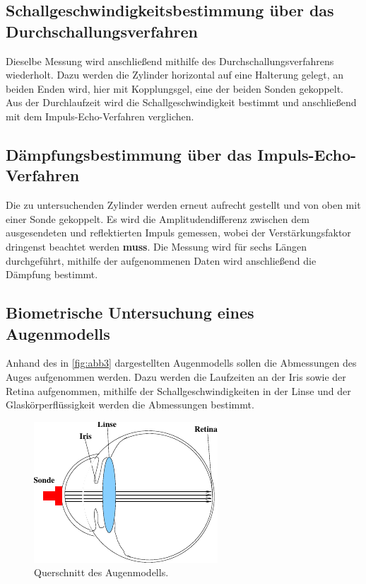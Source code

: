 \subsection*{Schallgeschwindigkeitsbestimmung über das Durchschallungsverfahren}

Dieselbe Messung wird anschließend mithilfe des Durchschallungsverfahrens wiederholt.
Dazu werden die Zylinder horizontal auf eine Halterung gelegt, an beiden Enden wird, hier mit Kopplungsgel, eine der beiden Sonden gekoppelt.
Aus der Durchlaufzeit wird die Schallgeschwindigkeit bestimmt und anschließend mit dem Impuls-Echo-Verfahren verglichen. \\


\subsection*{Dämpfungsbestimmung über das Impuls-Echo-Verfahren}

Die zu untersuchenden Zylinder werden erneut aufrecht gestellt und von oben mit einer Sonde gekoppelt.
Es wird die Amplitudendifferenz zwischen dem ausgesendeten und reflektierten Impuls gemessen, wobei der Verstärkungsfaktor dringenst beachtet werden \textbf{muss}.
Die Messung wird für sechs Längen durchgeführt, mithilfe der aufgenommenen Daten wird anschließend die Dämpfung bestimmt.


\subsection*{Biometrische Untersuchung eines Augenmodells}

Anhand des in \autoref{fig:abb3} dargestellten Augenmodells sollen die Abmessungen des Auges aufgenommen werden.
Dazu werden die Laufzeiten an der Iris sowie der Retina aufgenommen, mithilfe der Schallgeschwindigkeiten in der Linse und der Glaskörperflüssigkeit werden die Abmessungen bestimmt.
\begin{figure}
    \centering
    \includegraphics{figures/abb3.pdf} 
    \caption{Querschnitt des Augenmodells\cite{ap06}.}
    \label{fig:abb3}
\end{figure}






